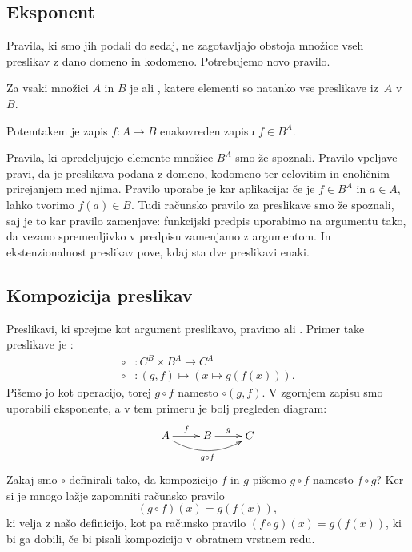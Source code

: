 

\subsection{Eksponent}
\label{sec:eksponent}

Pravila, ki smo jih podali do sedaj, ne zagotavljajo obstoja množice vseh preslikav z dano domeno in kodomeno. Potrebujemo novo pravilo.

\begin{pravilo}[Eksponent]
  Za vsaki množici $A$ in $B$ je  ali ,
  katere elementi so natanko vse preslikave iz~$A$ v~$B$.
\end{pravilo}

Potemtakem je zapis $f : A \to B$ enakovreden zapisu $f \in B^A$.

Pravila, ki opredeljujejo elemente množice $B^A$ smo že spoznali. Pravilo vpeljave pravi,
da je preslikava podana z domeno, kodomeno ter celovitim in enoličnim prirejanjem med
njima. Pravilo uporabe je kar aplikacija: če je $f \in B^A$ in $a \in A$, lahko tvorimo
$f(a) \in B$. Tudi računsko pravilo za preslikave smo že spoznali, saj je to kar pravilo
zamenjave: funkcijski predpis uporabimo na argumentu tako, da vezano spremenljivko v
predpisu zamenjamo z argumentom. In ekstenzionalnost preslikav pove, kdaj sta dve
preslikavi enaki.


\subsection{Kompozicija preslikav}
\label{sec:komp-presl}

Preslikavi, ki sprejme kot argument preslikavo, pravimo  ali . Primer take preslikave je :
%
\begin{align*}
  {\circ} &: C^B \times B^A \to C^A \\
  {\circ} &: (g, f) \mapsto (x \mapsto g(f(x))).
\end{align*}
%
Pišemo jo kot operacijo, torej $g \circ f$ namesto ${\circ}(g, f)$. V zgornjem zapisu smo
uporabili eksponente, a v tem primeru je bolj pregleden diagram:
%
\begin{equation*}
  \xymatrix{
    {A}
    \ar[r]^{f}
    \ar@/_3ex/[rr]_{g \circ f}
    &
    {B}
    \ar[r]^{g}
    &
    {C}
  }
\end{equation*}
%
Zakaj smo $\circ$ definirali tako, da kompozicijo $f$ in $g$ pišemo $g \circ f$ namesto
$f \circ g$? Ker si je mnogo lažje zapomniti računsko pravilo
%
\begin{equation*}
  (g \circ f)(x) = g(f(x)),
\end{equation*}
%
ki velja z našo definicijo, kot pa računsko pravilo $(f \circ g)(x) = g(f(x))$, ki bi ga dobili, če bi
pisali kompozicijo v obratnem vrstnem redu.

